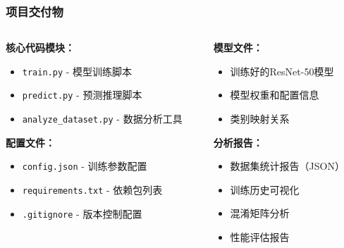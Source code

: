 \documentclass[12pt]{beamer}
\begin{document}
\begin{frame}
\frametitle{项目交付物}
\begin{columns}
\begin{column}{0.5\textwidth}
\textbf{核心代码模块：}
\begin{itemize}
    \item \texttt{train.py} - 模型训练脚本
    \item \texttt{predict.py} - 预测推理脚本
    \item \texttt{analyze\_dataset.py} - 数据分析工具
\end{itemize}

\vspace{0.3cm}
\textbf{配置文件：}
\begin{itemize}
    \item \texttt{config.json} - 训练参数配置
    \item \texttt{requirements.txt} - 依赖包列表
    \item \texttt{.gitignore} - 版本控制配置
\end{itemize}
\end{column}

\begin{column}{0.5\textwidth}
\textbf{模型文件：}
\begin{itemize}
    \item 训练好的ResNet-50模型
    \item 模型权重和配置信息
    \item 类别映射关系
\end{itemize}

\vspace{0.3cm}
\textbf{分析报告：}
\begin{itemize}
    \item 数据集统计报告（JSON）
    \item 训练历史可视化
    \item 混淆矩阵分析
    \item 性能评估报告
\end{itemize}
\end{column}
\end{columns}
\end{frame}
\end{document}
